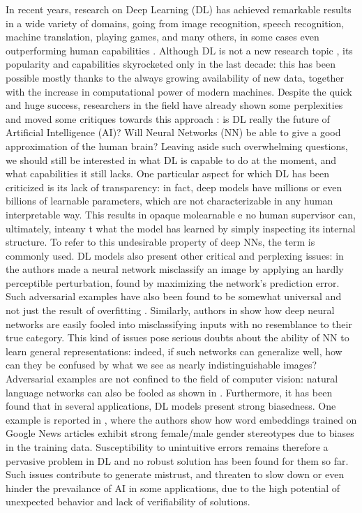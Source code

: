 In recent years, research on Deep Learning (DL) has achieved remarkable results in a wide variety of domains, going from image recognition, speech recognition, machine translation, playing games, and many others, 
	in some cases even outperforming human capabilities \cite{jumper2021highly, gebru2017using, schrittwieser2020mastering}. 
Although DL is not a new research topic \cite{lecun1989digits,rosenblatt1958perceptron}, its popularity and capabilities skyrocketed only in the last decade: this has been possible mostly thanks to the always growing availability of new data, together with the increase in computational power of modern machines.
Despite the quick and huge success, researchers in the field have already shown some perplexities and moved some critiques towards this approach \cite{marcus2018appraisal,sabour2017dynamic}: is DL really the future of Artificial Intelligence (AI)? Will Neural Networks (NN) be able to give a good approximation of the human brain? Leaving aside such overwhelming questions, we should still be interested in what DL is capable to do at the moment, and what capabilities it still lacks.
One particular aspect for which DL has been criticized is its lack of transparency: in fact, deep models have millions or even billions of learnable parameters, which are not characterizable in any human interpretable way. This results in opaque molearnable e no human supervisor can, ultimately, inteany t what the model has learned by simply inspecting its internal structure. To refer to this undesirable property of deep NNs, the term  is commonly used. DL models also present other critical and perplexing issues: in \cite{szegedy2013intriguing} the authors made a neural network misclassify an image by applying an hardly perceptible perturbation, found by maximizing the network’s prediction error. Such adversarial examples have also been found to be somewhat universal and not just the result of overfitting \cite{buckner2020adversarial}. Similarly, authors in \cite{nguyen2015fooled} show how deep neural networks are easily fooled into misclassifying inputs with no resemblance to their true category. This kind of issues pose serious doubts about the ability of NN to learn general representations: indeed, if such networks can generalize well, how can they be confused by what we see as nearly indistinguishable images?  Adversarial examples are not confined to the field of computer vision: natural language networks can also be fooled as shown in \cite{jia2017adversarial,zhang2019generating}. Furthermore, it has been found that in several applications, DL models present strong biasedness. One example is reported in \cite{bolukbasi2016debiasing}, where the authors show how word embeddings trained on Google News articles exhibit strong female/male gender stereotypes due to biases in the training data. Susceptibility to unintuitive errors remains therefore a pervasive problem in DL and no robust solution has been found for them so far. Such issues contribute to generate mistrust, and threaten to slow down or even hinder the prevailance of AI in some applications, due to the high potential of unexpected behavior and lack of verifiability of solutions.
